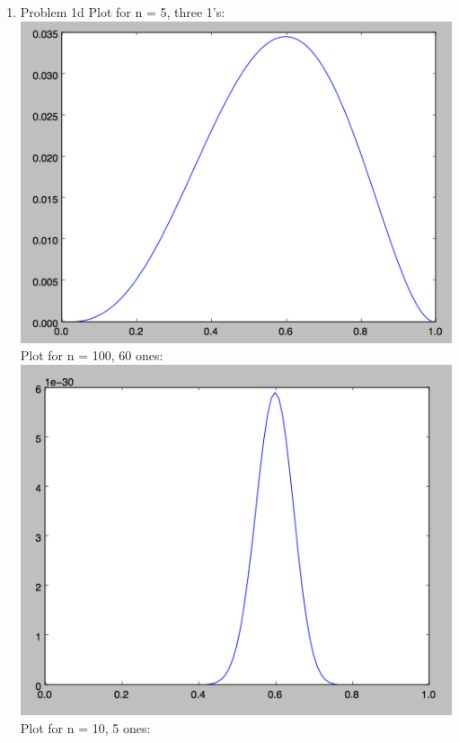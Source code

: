 \documentclass[11pt]{article}
\newcommand{\solution}[1]{{{\color{blue}{\bf Solution:} {#1}}}}
\begin{document}
\begin{enumerate}
\item Problem 1d
\solution{
Plot for n = 5, three 1's:
\newline{}
\includegraphics[scale=0.5]{threeones.png} \newline{}
Plot for n = 100, 60 ones: 
\newline{}
\includegraphics[scale=0.5]{sixtyones.png} \newline{}
Plot for n = 10, 5 ones: 
\newline{}
}
\end{enumerate}
\end{document}
